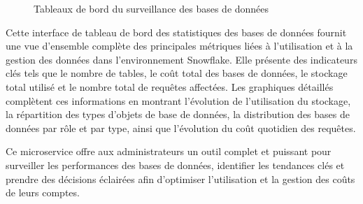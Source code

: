 \begin{itemize}
\begin{figure}[H]
                \caption{Tableaux de bord du surveillance des bases de données}
                    \label{fig:database}
                \end{figure}
                \par Cette interface de tableau de bord des statistiques des bases de données fournit une vue d'ensemble complète des principales métriques liées à l'utilisation et à la gestion des données dans l'environnement Snowflake. 
                Elle présente des indicateurs clés tels que le nombre de tables, le coût total des bases de données, le stockage total utilisé et le nombre total de requêtes affectées.
                Les graphiques détaillés complètent ces informations en montrant l'évolution de l'utilisation du stockage, la répartition des types d'objets de base de données, la distribution des bases de données par rôle et par type, ainsi que l'évolution du coût quotidien des requêtes. \\ 
                
\end{itemize}
\par Ce microservice  offre aux administrateurs un outil complet et puissant pour surveiller les performances des bases de données, identifier les tendances clés et prendre des décisions éclairées afin d'optimiser l'utilisation et la gestion des coûts de leurs comptes.
